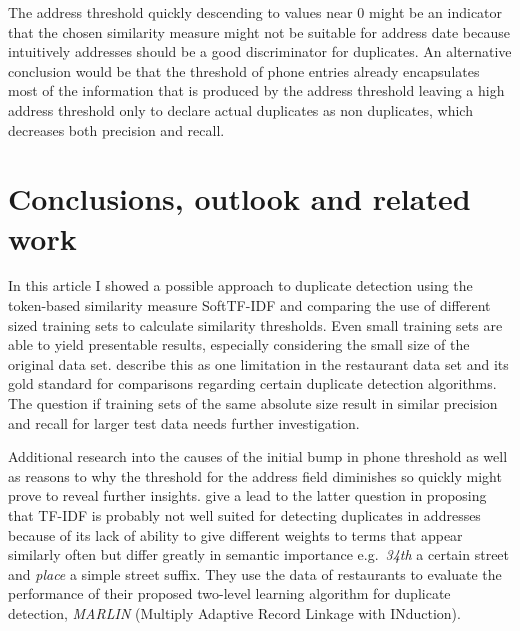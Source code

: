 \documentclass[conference]{IEEEtran}
\begin{document}
The address threshold quickly descending to values near 0 might be an indicator that the chosen similarity measure might not be suitable for address date because intuitively addresses should be a good discriminator for duplicates. An alternative conclusion would be that the threshold of phone entries already encapsulates most of the information that is produced by the address threshold leaving a high address threshold only to declare actual duplicates as non duplicates, which decreases both precision and recall.


\section{Conclusions, outlook and related work}\label{conclusions}
In this article I showed a possible approach to duplicate detection using the token-based similarity measure SoftTF-IDF and comparing the use of different sized training sets to calculate similarity thresholds. Even small training sets are able to yield presentable results, especially considering the small size of the original data set. \textcite{Vogel.2014} describe this as one limitation in the restaurant data set and its gold standard for comparisons regarding certain duplicate detection algorithms. The question if training sets of the same absolute size result in similar precision and recall for larger test data needs further investigation.

Additional research into the causes of the initial bump in phone threshold as well as reasons to why the threshold for the address field diminishes so quickly might prove to reveal further insights. \textcite{Bilenko.2003b} give a lead to the latter question in proposing that TF-IDF is probably not well suited for detecting duplicates in addresses because of its lack of ability to give different weights to terms that appear similarly often but differ greatly in semantic importance e.g.\ \emph{34th} a certain street and \emph{place} a simple street suffix. They use the data of restaurants to evaluate the performance of their proposed two-level learning algorithm for duplicate detection, \emph{MARLIN} (Multiply Adaptive Record Linkage with INduction).






\printbibliography
\end{document}
